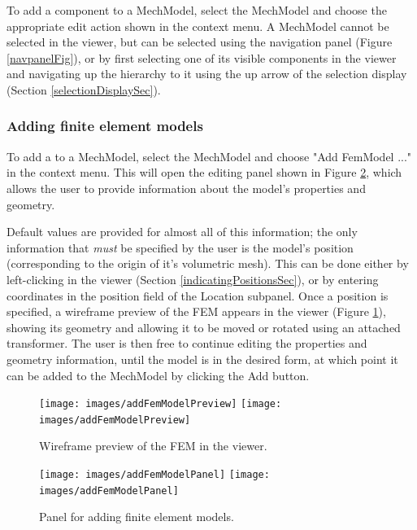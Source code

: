 \documentclass{article}
\begin{document}
To add a component to a MechModel, select the MechModel and choose the
appropriate edit action shown in the context menu. A MechModel cannot
be selected in the viewer, but can be selected using the navigation
panel (Figure \ref{navpanelFig}), or by first selecting one of its visible
components in the viewer and navigating up the hierarchy to it using
the {\sf up arrow} of the selection display (Section \ref{selectionDisplaySec}).

\subsubsection{Adding finite element models}

To add a  to a MechModel,
select the MechModel and choose {\sf "Add FemModel ..."} in the context
menu.  This will open the editing panel shown in Figure \ref{addFemModelPanelFig},
which allows the user to provide information about the model's
properties and geometry.

Default values are provided for almost all of this information; the
only information that {\it must} be specified by the user is the model's
position (corresponding to the origin of it's volumetric mesh). This
can be done either by left-clicking in the viewer
(Section \ref{indicatingPositionsSec}), or by entering coordinates in the
{\sf position} field of the {\sf Location} subpanel.  Once a position is
specified, a wireframe preview of the FEM appears in the viewer
(Figure \ref{addFemModelPreviewFig}), showing its geometry and allowing it to be
moved or rotated using an attached transformer. The user is then free
to continue editing the properties and geometry information, until the
model is in the desired form, at which point it can be added to the
MechModel by clicking the {\sf Add} button.

\begin{figure}
\begin{center}
\iflatexml
\texttt{[image: images/addFemModelPreview]}
\else
\texttt{[image: images/addFemModelPreview]}
\fi
\end{center}
\caption{Wireframe preview of the FEM in the viewer.}%
\label{addFemModelPreviewFig}
\end{figure}

\begin{figure}
\begin{center}
\iflatexml
\texttt{[image: images/addFemModelPanel]}
\else
\texttt{[image: images/addFemModelPanel]}
\fi
\end{center}
\caption{Panel for adding finite element models.}%
\label{addFemModelPanelFig}
\end{figure}
\end{document}
